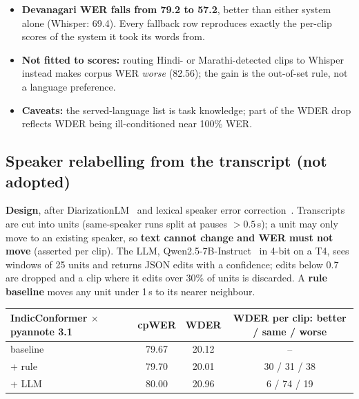 \documentclass[10pt]{article}
\newcommand{\x}{$\times$}
\begin{document}
\begin{itemize}
  \item \textbf{Devanagari WER falls from 79.2 to 57.2}, better than either system alone (Whisper: 69.4). Every fallback
        row reproduces exactly the per-clip scores of the system it took its words from.
  \item \textbf{Not fitted to scores:} routing Hindi- or Marathi-detected clips to Whisper instead makes corpus WER
        \emph{worse} (82.56); the gain is the out-of-set rule, not a language preference.
  \item \textbf{Caveats:} the served-language list is task knowledge; part of the WDER drop reflects WDER being
        ill-conditioned near 100\% WER.
\end{itemize}

\subsection{Speaker relabelling from the transcript (not adopted)}\label{sec:relabel}

\textbf{Design}, after DiarizationLM~\citep{wang2024diarizationlm} and lexical speaker error correction~\citep{paturi2023lexical}.
Transcripts are cut into units (same-speaker runs split at pauses $>0.5$\,s); a unit may only move to an existing
speaker, so \textbf{text cannot change and WER must not move} (asserted per clip). The LLM,
Qwen2.5-7B-Instruct~\citep{qwen2024qwen25} in 4-bit on a T4, sees windows of 25 units and returns JSON edits with a
confidence; edits below 0.7 are dropped and a clip where it edits over 30\% of units is discarded. A \textbf{rule
baseline} moves any unit under 1\,s to its nearer neighbour.

\begin{center}\footnotesize
\begin{tabular}{@{}lccc@{}}
\toprule
IndicConformer \x{} pyannote 3.1 & cpWER & WDER & WDER per clip: better / same / worse\\
\midrule
baseline & 79.67 & 20.12 & --\\
+ rule   & 79.70 & 20.01 & 30 / 31 / 38\\
+ LLM    & 80.00 & 20.96 & \phantom{0}6 / 74 / 19\\
\bottomrule
\end{tabular}
\end{center}
\end{document}
